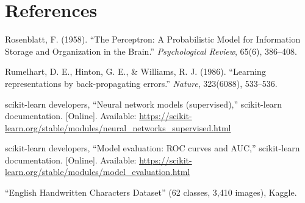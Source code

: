 \documentclass[12pt,a4paper]{article}
\begin{document}
\section{References}
\begin{enumerate}[label={[\arabic*]}]
\item Rosenblatt, F. (1958). ``The Perceptron: A Probabilistic Model for Information Storage and
Organization in the Brain.'' \emph{Psychological Review}, 65(6), 386--408.
\item Rumelhart, D. E., Hinton, G. E., \& Williams, R. J. (1986). ``Learning representations by
back-propagating errors.'' \emph{Nature}, 323(6088), 533--536.
\item scikit-learn developers, ``Neural network models (supervised),'' scikit-learn
documentation. [Online]. Available:
\url{https://scikit-learn.org/stable/modules/neural_networks_supervised.html}
\item scikit-learn developers, ``Model evaluation: ROC curves and AUC,'' scikit-learn
documentation. [Online]. Available: \url{https://scikit-learn.org/stable/modules/model_evaluation.html}
\item ``English Handwritten Characters Dataset'' (62 classes, 3{,}410 images), Kaggle.
\end{enumerate}
\end{document}
